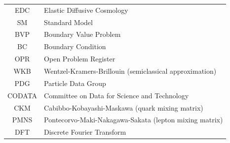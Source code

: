 \begin{tabular}{cl}
EDC & Elastic Diffusive Cosmology \\
SM & Standard Model \\
BVP & Boundary Value Problem \\
BC & Boundary Condition \\
OPR & Open Problem Register \\
WKB & Wentzel-Kramers-Brillouin (semiclassical approximation) \\
PDG & Particle Data Group \\
CODATA & Committee on Data for Science and Technology \\
CKM & Cabibbo-Kobayashi-Maskawa (quark mixing matrix) \\
PMNS & Pontecorvo-Maki-Nakagawa-Sakata (lepton mixing matrix) \\
DFT & Discrete Fourier Transform \\
\end{tabular}
